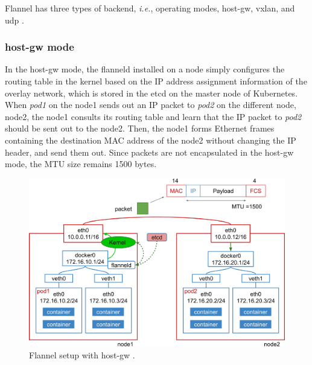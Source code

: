 Flannel has three types of backend, {\it i.e.}, operating modes, host-gw, vxlan, and udp \cite{CoreOSFlannelBackend}.

\subsubsection{host-gw mode}

In the host-gw mode, the flanneld installed on a node simply configures the routing table in the kernel 
based on the IP address assignment information of the overlay network, which is stored in the etcd \cite{CoreOSEtcd} on the master node of Kubernetes.
When {\em pod1} on the node1 sends out an IP packet to {\em pod2} on the different node, node2, 
the node1 consults its routing table and learn that the IP packet to {\em pod2} should be sent out to the node2.
Then, the node1 forms Ethernet frames containing the destination MAC address of the node2 
without changing the IP header, and send them out.
Since packets are not encapsulated in the host-gw mode, the MTU size remains 1500 bytes.

\begin{figure}[h]
  \centering
  \includegraphics[width=0.95\columnwidth]{Figs/flannel-host-gw}

  \par\bigskip
  \centering
  \begin{minipage}{0.9\columnwidth}
    \caption[Flannel setup with host-gw mode]{
      Flannel setup with host-gw .
    }
    \label{Figs/flannel-host-gw}
  \end{minipage}
\end{figure}

